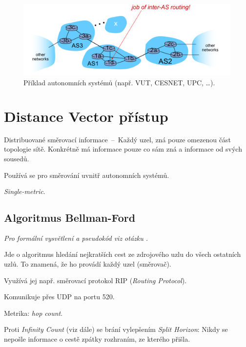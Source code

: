 \begin{figure}[H]
    \centering
    \includegraphics[width=1\linewidth]{autonomni_systemy.pdf}
    \caption{Příklad autonomních systémů (např. VUT, CESNET, UPC, \dots).}
\end{figure}


\section{Distance Vector přístup}

\begin{compactitem}
    \item Distribuované směrovací informace~--~Každý uzel, zná pouze omezenou část topologie sítě. Konkrétně má informace pouze co sám zná a informace od svých sousedů.
    \item Používá se pro směrování uvnitř autonomních systémů.
    \item \textit{Single-metric}.
\end{compactitem}

\subsection{Algoritmus Bellman-Ford}

\begin{compactitem}
    \item \textit{Pro formální vysvětlení a pseudokód viz otázku .}
    \item Jde o algoritmus hledání nejkratších cest ze zdrojového uzlu do všech ostatních uzlů. To znamená, že ho provádí každý uzel (směrovač).
    \item Využívá jej např. směrovací protokol RIP (\textit{Routing Protocol}). \begin{compactitem}
        \item Komunikuje přes UDP na portu 520.
        \item Metrika: \textit{hop count}.
        \item Proti \textit{Infinity Count} (viz dále) se brání vylepšením \textit{Split Horizon}: Nikdy se nepošle informace o cestě zpátky rozhraním, ze kterého přišla.
    \end{compactitem}
\end{compactitem}


